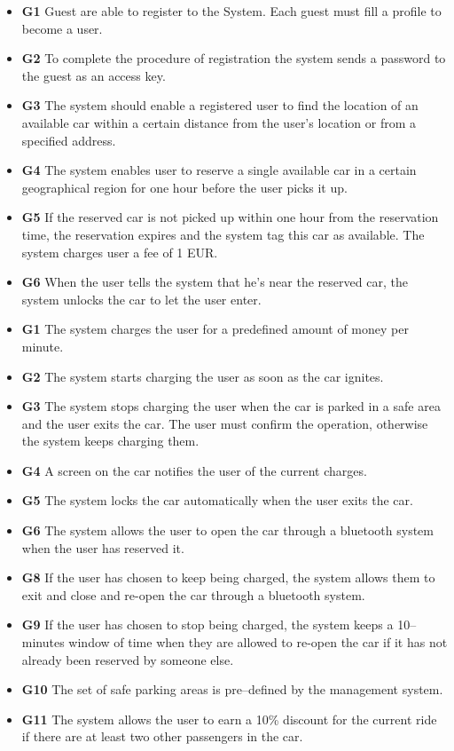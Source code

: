 			\begin{itemize}
				\item \textbf{G1} Guest are able to register to the System. Each guest must fill a profile to become a user. %
				\item \textbf{G2} To complete the procedure of registration the system sends a password to the guest as an access key. %
				\item \textbf{G3} The system should enable a registered user to find the location of an available car within a certain distance from the user's location or from a specified address.
				\item \textbf{G4} The system enables user to reserve a single available car in a certain geographical region for one hour before the user picks it up.
				\item \textbf{G5} If the reserved car is not picked up within one hour from the reservation time, the reservation expires and the system tag this car as available. The system charges user a fee of 1 EUR. 
				\item \textbf{G6} When the user tells the system that he's near the reserved car, the system unlocks the car to let the user enter.  

				\item \textbf{G1} The system charges the user for a predefined amount of money per minute.
				\item \textbf{G2} The system starts charging the user as soon as the car ignites.
				\item \textbf{G3} The system stops charging the user when the car is parked in a safe area and the user exits the car. The user must confirm the operation, otherwise the system keeps charging them. 
				\item \textbf{G4} A screen on the car notifies the user of the current charges.
				\item \textbf{G5} The system locks the car automatically when the user exits the car. 
				\item \textbf{G6} The system allows the user to open the car through a bluetooth system when the user has reserved it.
				\item \textbf{G8} If the user has chosen to keep being charged, the system allows them to exit and close and re-open the car through a bluetooth system.
				\item \textbf{G9} If the user has chosen to stop being charged, the system keeps a 10–minutes window of time when they are allowed to re-open the car if it has not already been reserved by someone else.
				\item \textbf{G10} The set of safe parking areas is pre–defined by the management system.
				\item \textbf{G11} The system allows the user to earn a 10\% discount for the current ride if there are at least two other passengers in the car.


\end{itemize}
